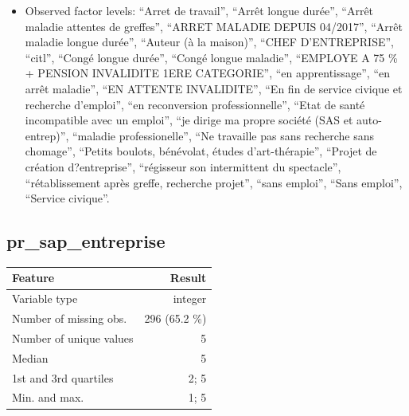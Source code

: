 \documentclass[
  letterpaper,
  DIV=11,
  numbers=noendperiod]{scrartcl}
\providecommand{\tightlist}{%
  \setlength{\itemsep}{0pt}\setlength{\parskip}{0pt}}
\begin{document}
\emini

\begin{itemize}
\tightlist
\item
  Observed factor levels: ``Arret de travail'', ``Arrêt longue durée'',
  ``Arrêt maladie attentes de greffes'', ``ARRET MALADIE DEPUIS
  04/2017'', ``Arrêt maladie longue durée'', ``Auteur (à la maison)'',
  ``CHEF D'ENTREPRISE'', ``citl'', ``Congé longue durée'', ``Congé
  longue maladie'', ``EMPLOYE A 75 \% + PENSION INVALIDITE 1ERE
  CATEGORIE'', ``en apprentissage'', ``en arrêt maladie'', ``EN ATTENTE
  INVALIDITE'', ``En fin de service civique et recherche d'emploi'',
  ``en reconversion professionnelle'', ``Etat de santé incompatible avec
  un emploi'', ``je dirige ma propre société (SAS et auto-entrep)'',
  ``maladie professionelle'', ``Ne travaille pas sans recherche sans
  chomage'', ``Petits boulots, bénévolat, études d'art-thérapie'',
  ``Projet de création d?entreprise'', ``régisseur son intermittent du
  spectacle'', ``rétablissement après greffe, recherche projet'', ``sans
  emploi'', ``Sans emploi'', ``Service civique''.
\end{itemize}

\fullline

\subsection{pr\_sap\_entreprise}\label{pr_sap_entreprise}

\bminione

\begin{longtable}[]{@{}lr@{}}
\toprule\noalign{}
Feature & Result \\
\midrule\noalign{}
\endhead
\bottomrule\noalign{}
\endlastfoot
Variable type & integer \\
Number of missing obs. & 296 (65.2 \%) \\
Number of unique values & 5 \\
Median & 5 \\
1st and 3rd quartiles & 2; 5 \\
Min. and max. & 1; 5 \\
\end{longtable}

\emini
\bminitwo
\end{document}
